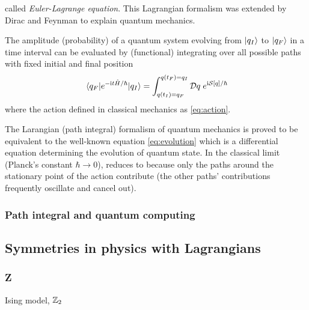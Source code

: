 called \emph{Euler-Lagrange equation}.
This Lagrangian formalism was extended by Dirac \cite{diracAnalogyClassicalQuantum1945} and Feynman \cite{feynmanQuantumMechanicsPath2010} to explain quantum mechanics. 
\begin{axiom}\label{thm:path_integral}
    The amplitude (probability) of a quantum system evolving from $\ket{q_I}$ to $\ket{q_F}$ in a time interval can be evaluated by (functional) integrating over all possible paths with fixed initial and final position 
    \begin{equation}
		\mel{q_F}{e^{-\textup{i}t\hat{H}/\hbar}}{q_I} =
        \int_{q(t_I)= q_F}^{q(t_F)=q_I} \mathcal{D} q \; e^{\textup{i} \mathcal{S}[q]/\hbar}
    \end{equation}
	where the action defined in classical mechanics as \cref{eq:action}.
\end{axiom}
The Larangian (path integral) formalism of quantum mechanics is proved to be equivalent to the well-known \schrodinger equation \cref{eq:evolution} \cite[Chp4]{feynmanQuantumMechanicsPath2010} 
which is a differential equation determining the evolution of quantum state.
In the classical limit (Planck's constant $\hbar\to 0$),  reduces to 
because only the paths around the stationary point of the action contribute 
(the other paths' contributions frequently oscillate and cancel out).
\subsubsection{Path integral and quantum computing}
\cite{xuLagrangianFormalismQuantum2021}

\subsection{Symmetries in physics with Lagrangians}
\subsubsection{Z}
Ising model, $\mathbb{Z}_2$


